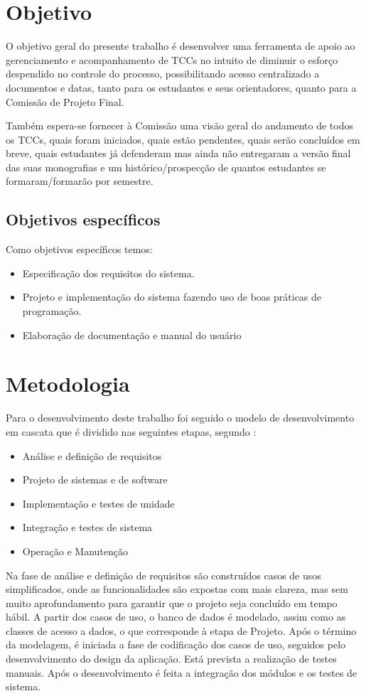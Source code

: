 \section{Objetivo}
O objetivo geral do presente trabalho é desenvolver uma ferramenta de apoio ao gerenciamento
e acompanhamento de TCCs no intuito de diminuir o esforço despendido no controle do processo, 
possibilitando acesso centralizado a documentos e
datas, tanto para os estudantes e seus orientadores, quanto para a Comissão de Projeto Final.

Também espera-se fornecer à Comissão uma visão geral do andamento de todos os TCCs, quais foram
iniciados, quais estão pendentes, quais serão concluídos em breve, quais estudantes já
defenderam mas ainda não entregaram a versão final das suas monografias e um histórico/prospecção
de quantos estudantes se formaram/formarão por semestre.

\subsection{Objetivos específicos}
Como objetivos específicos temos:
\begin{itemize}
\item Especificação dos requisitos do sistema.
\item Projeto e implementação do sistema fazendo uso de boas práticas de  programação. 
\item Elaboração de documentação e manual do usuário 
\end{itemize}

\section{Metodologia}

Para o desenvolvimento deste trabalho foi seguido o modelo de desenvolvimento em cascata que é
dividido nas seguintes etapas, segundo \cite{sommerville:2003}:
\begin{itemize}
\item Análise e definição de requisitos 
\item Projeto de sistemas e de software 
\item Implementação e testes de unidade 
\item Integração e testes de sistema 
\item Operação e Manutenção 
\end{itemize}
 
Na fase de análise e definição de requisitos são construídos casos de usos 
simplificados, onde as funcionalidades são expostas com mais clareza, mas sem 
muito aprofundamento para garantir que o projeto seja concluído em tempo hábil.
A partir dos casos de uso, o banco de dados é modelado, assim como as classes 
de acesso a dados, o que corresponde à etapa de Projeto. Após o término da modelagem,
é iniciada a fase de codificação dos casos de uso, seguidos pelo desenvolvimento 
do design da aplicação. Está prevista a realização de testes manuais. Após o 
desenvolvimento é feita a integração dos módulos e os testes de sistema.


